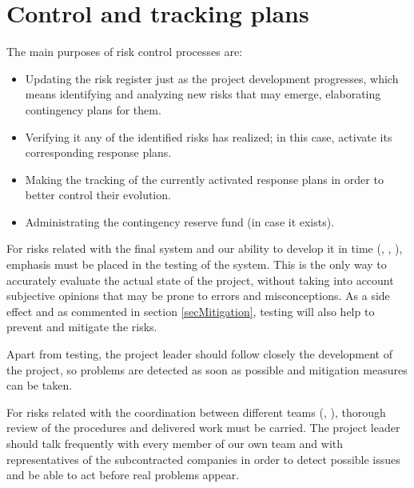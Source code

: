 \section{Control and tracking plans}

The main purposes of risk control processes are:
\begin{itemize} 
\item Updating the risk register just as the project development progresses, which means identifying and analyzing new risks that may emerge, elaborating contingency plans for them.
\item Verifying it any of the identified risks has realized; in this case, activate its corresponding response plans.
\item Making the tracking of the currently activated response plans in order to better control their evolution.
\item Administrating the contingency reserve fund (in case it exists). 
\end{itemize}

For risks related with the final system and our ability to develop it in time (, , ), emphasis must be placed in the testing of the system. This is the only way to accurately evaluate the actual state of the project, without taking into account subjective opinions that may be prone to errors and misconceptions. As a side effect and as commented in section \ref{secMitigation}, testing will also help to prevent and mitigate the risks.

Apart from testing, the project leader should follow closely the development of the project, so problems are detected as soon as possible and mitigation measures can be taken.

For risks related with the coordination between different teams (, ), thorough review of the procedures and delivered work must be carried. The project leader should talk frequently with every member of our own team and with representatives of the subcontracted companies in order to detect possible issues and be able to act before real problems appear.
